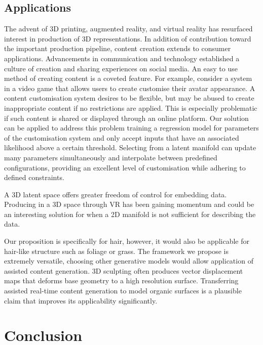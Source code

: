 \documentclass[ %
author={Dillon Keith Diep},
supervisor={Dr. Carl Henrik Ek},
degree={MEng},
title={ART-CG Hair:},
subtitle={Assisted Real-time Content Generation of Stylised Virtual Hair},
type={Research},
year={2017} ]{dissertation}
\begin{document}
\section{Applications}
The advent of 3D printing, augmented reality, and virtual reality has resurfaced interest in production of 3D representations. In addition of contribution toward the important production pipeline, content creation extends to consumer applications. Advancements in communication and technology established a culture of creation and sharing experiences on social media. An easy to use method of creating content is a coveted feature.
For example, consider a system in a video game that allows users to create customise their avatar appearance. A content customisation system desires to be flexible, but may be abused to create inappropriate content if no restrictions are applied. This is especially problematic if such content is shared or displayed through an online platform. Our solution can be applied to address this problem training a regression model for parameters of the customisation system and only accept inputs that have an associated likelihood above a certain threshold. Selecting from a latent manifold can update many parameters simultaneously and interpolate between predefined configurations, providing an excellent level of customisation while adhering to defined constraints.

A 3D latent space offers greater freedom of control for embedding data. Producing in a 3D space through VR has been gaining momentum and could be an interesting solution for when a 2D manifold is not sufficient for describing the data.

Our proposition is specifically for hair, however, it would also be applicable for hair-like structure such as foliage or grass. The framework we propose is extremely versatile, choosing other generative models would allow application of assisted content generation. 3D sculpting often produces vector displacement maps that deforms base geometry to a high resolution surface. Transferring assisted real-time content generation to model organic surfaces is a plausible claim that improves its applicability significantly.


\chapter{Conclusion}
\label{chap:conclusion}
\end{document}
